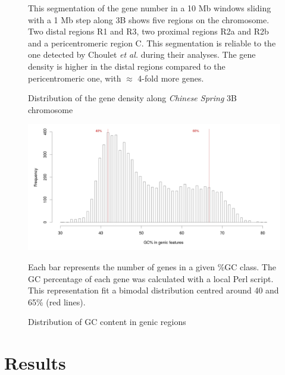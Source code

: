 \documentclass[a4paper, 12pt]{article}
\begin{document}
\begin{onehalfspace}
\begin{figure}
      \vspace{0.5cm}
      \caption{Distribution of the gene density along \textit{Chinese Spring} 3B chromosome} 
      \label{fig:F5}
\footnotesize{This segmentation of the gene number in a 10 Mb windows sliding with a 1 Mb step along 3B shows five regions on the chromosome. Two distal regions R1 and R3, two proximal regions R2a and R2b and a pericentromeric region C. This segmentation is reliable to the one detected by Choulet \textit{et al.} during their analyses. The gene density is higher in the distal regions compared to the pericentromeric one, with $\approx$ 4-fold more genes.}
    \end{figure}
    \begin{figure}
    \vspace{-0.7cm}
      \centering \includegraphics[scale=0.19]{Figures/Figure_6.jpg}
      \vspace{0.5cm}
      \caption{Distribution of GC content in genic regions} 
      \label{fig:F6}
\footnotesize{Each bar represents the number of genes in a given \%GC class. The GC percentage of each gene was calculated with a local Perl script. This representation fit a bimodal distribution centred around 40 and 65\% (red lines).}
    \end{figure}
\addtocounter{page}{-1}
\newpage
\clearpage 

\part{Results}
\setcounter{section}{0}


\end{onehalfspace}
\end{document}
